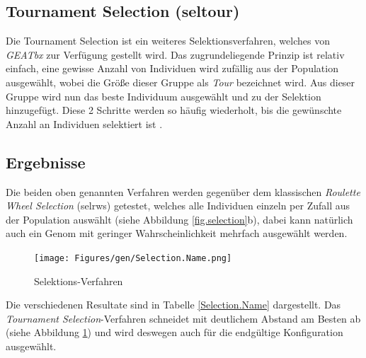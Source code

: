 \subsection{Tournament Selection (seltour)}
Die Tournament Selection ist ein weiteres Selektionsverfahren,
welches von \emph{GEATbx} zur Verfügung gestellt wird. Das zugrundeliegende
Prinzip ist relativ einfach, eine gewisse Anzahl von Individuen wird zufällig
aus der Population ausgewählt, wobei die Größe dieser Gruppe als \emph{Tour}
bezeichnet wird. Aus dieser Gruppe wird nun das beste Individuum ausgewählt und
zu der Selektion hinzugefügt. Diese 2 Schritte werden so häufig wiederholt, bis
die gewünschte Anzahl an Individuen selektiert ist \citep{seltour}.


\subsection{Ergebnisse}
Die beiden oben genannten Verfahren werden gegenüber dem
klassischen \emph{Roulette Wheel Selection} (selrws) getestet, welches alle
Individuen einzeln per Zufall aus der Population auswählt (siehe Abbildung
\ref{fig.selection}b), dabei kann natürlich
auch ein Genom mit geringer Wahrscheinlichkeit mehrfach ausgewählt werden.



\begin{figure}[h!]
  \centering
  \texttt{[image: Figures/gen/Selection.Name.png]}
  \caption{Selektions-Verfahren}\label{fig.selectionname}
\end{figure}

\noindent Die verschiedenen Resultate sind in Tabelle \ref{Selection.Name}
dargestellt. Das \emph{Tournament Selection}-Verfahren schneidet mit deutlichem
Abstand am Besten ab (siehe Abbildung \ref{fig.selectionname}) und wird deswegen
auch für die endgültige Konfiguration ausgewählt.

